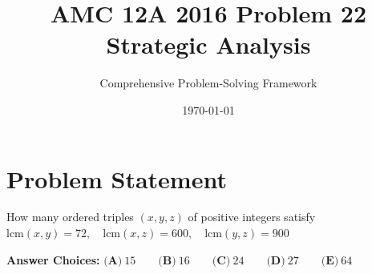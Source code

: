 \documentclass[12pt]{article}
\title{\textbf{AMC 12A 2016 Problem 22\\Strategic Analysis}}
\author{Comprehensive Problem-Solving Framework}
\date{\today}
\begin{document}
\maketitle

\section*{Problem Statement}

How many ordered triples $(x,y,z)$ of positive integers satisfy 
$\text{lcm}(x,y) = 72, \quad \text{lcm}(x,z) = 600, \quad \text{lcm}(y,z)=900$

\textbf{Answer Choices:} 
$\textbf{(A)}\ 15\qquad\textbf{(B)}\ 16\qquad\textbf{(C)}\ 24\qquad\textbf{(D)}\ 27\qquad\textbf{(E)}\ 64$

\vspace{1em}
\end{document}

